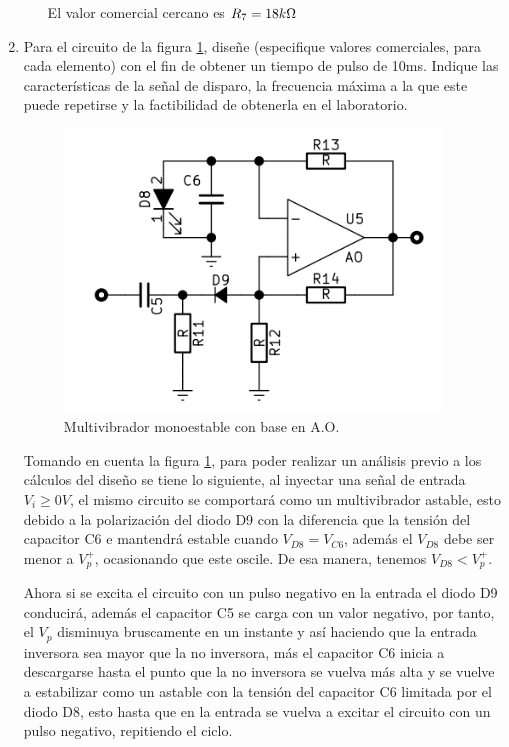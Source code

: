 \begin{enumerate}
\begin{itemize}
                        El valor comercial cercano es $R_7=18 k\ohm$

                                            
                \end{itemize}

            
            \item Para el circuito de la figura \ref{fig:monoestable}, diseñe (especifique valores comerciales, para cada elemento) con el fin de obtener un tiempo de pulso de 10ms. Indique las características de la señal de disparo, la frecuencia máxima a la que este puede repetirse y la factibilidad de obtenerla en el laboratorio.

                \begin{figure}[H]
                    \centering
                    \includegraphics[width=10cm]{Circuitos/monoestable.png}
                    \caption{Multivibrador monoestable con base en A.O.}
                    \label{fig:monoestable}
                \end{figure}
            
                Tomando en cuenta la figura \ref{fig:monoestable}, para poder realizar un análisis previo a los cálculos del diseño se tiene lo siguiente, al inyectar una señal de entrada $V_i \geq 0V$, el mismo circuito se comportará como un multivibrador astable, esto debido a la polarización del diodo D9 con la diferencia que la tensión del capacitor C6 e mantendrá estable cuando $V_{D8}=V_{C6}$, además el $V_{D8}$ debe ser menor a $V_p^+$, ocasionando que este oscile. De esa manera, tenemos $V_{D8}<V_p^+$.

                Ahora si  se excita el circuito con un pulso negativo en la entrada el diodo D9 conducirá, además el capacitor C5 se carga con un valor negativo, por tanto, el $V_p$ disminuya bruscamente en un instante y así haciendo que la entrada inversora sea mayor que la no inversora, más el capacitor C6 inicia a descargarse hasta el punto que la no inversora se vuelva más alta y se vuelve a estabilizar como un astable con la tensión del capacitor C6 limitada por el diodo D8, esto hasta que en la entrada se vuelva a excitar el circuito con un pulso negativo, repitiendo el ciclo.


\end{enumerate}
